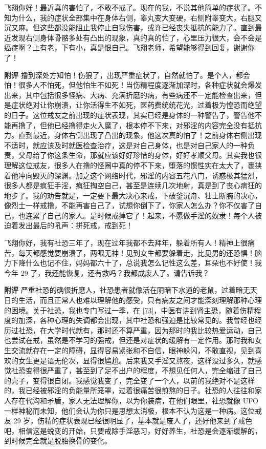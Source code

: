 \begin{case}
    飞翔你好！最近真的害怕了，不敢不戒了。现在的我，不说其他简单的症状了。不知为什么，我的症状全部集中在身体右侧，睾丸变大变硬，右侧附睾变大，右腿又沉又麻。但这些都没能阻止我停止自我伤害，或许已经丧失抵抗的能力了。直到最近发现右侧身体骨骼多处有凸出的现象，真的真的怕了，心里压力很大，会不会是癌症啊？上有老，下有小，真是恨自己。飞翔老师，希望能够得到回复，谢谢你了！

    \textbf{附评} 撸到深处方知怕！伤狠了，出现严重症状了，自然就怕了。是个人，都会怕！很多人不怕死，但他怕生不如死！当伤精程度逐渐加深时，各种症状就会爆发出来，其中包括很多怪病、大病、充满折磨的病，有些病还不一定能检查出来，但是症状绝对让你崩溃，让你活得生不如死，医药费统统花光，过着极为惶恐而绝望的日子。这位戒友之前出现的症状表现，其实已经是身体的一种警告了，警告他不能再撸了，但他已经撸得走火入魔了，根本停不下来，对邪淫的内容完全没有抵抗力。直到最近，身体右侧出现了凸出的现象，他这次真的怕了！之前身体右侧出现不适时，就应该及时就医检查治疗，这是对自己身体，也是对自己家人的一种负责，父母给了你这条生命，那就应该好好珍惜的身体，好好孝顺父母。其实我也很理解这位戒友，很多人在撸的怪圈中真的停不下来，堕落的惯性实在太大了，裹挟着他冲向毁灭的深渊。加之这个网络时代，邪淫的内容五花八门，诱惑极其猛烈，很多人都是疯狂手淫，疯狂掏空自己，甚至是连续几次地射，真是到了丧心病狂的地步了。我的劝告就是，一定要下最大决心来戒，下破釜沉舟、壮士断腕的决心，像烈士一样戒撸，不能再害自己了，试想你倒下了，你家人怎么办？你不仅害了自己，也连累了自己的家人。是时候戒掉它了！起来，不愿做手淫的奴隶！每个人被迫着发出最后的吼声：拼死戒，戒到死！
\end{case}

\begin{case}
    飞翔你好，我有社恐三年了，现在过年我都不去拜年，躲着所有人！精神上很痛苦，每天都感觉要崩溃了，两眼无神！见到女生都要躲着走，比见男的还恐惧！脑力下降什么也记不住，妈妈都六十了，总说我怎么记性这么差，耳朵也不好使！我今年 29 了，我还能恢复，还有救吗？我都成废人了。请告诉我？

    \textbf{附评} 严重社恐的确很折磨人，社恐患者就像活在阴暗下水道的老鼠，过着暗无天日的生活，而且正常人也难以理解他的感受，只有病友之间才能深刻理解那种心理的困境。关于社恐，我也专门写过一季，在 \ref{73}，中医有讲到肾主恐，随着伤精程度的加深，各种心理的失调都会出现，其中社恐和强迫是比较常见的。我曾经也经历过社恐，在大学时代就有，那时还不算严重，因为那时的我比较热爱运动，自己也尝试在戒，虽然是不学习的强戒，但还是对症状的缓解有一定作用。那时我和女生交流就存在一定的障碍，显得容易紧张和不自信，眼神躲闪，不敢直视，见到喜欢的女生更是语无伦次，显得很尴尬。后来我又手淫又熬夜，这样没过多久，就感觉社恐变得很严重了，甚至到了足不出户的程度，不想见任何人，完全缩进了自己的壳子，变得很自闭。我感觉我变了，完全变了一个人，以前的我绝对不是这样的，我已经被邪淫的负能量所笼罩，过着很痛苦很煎熬的日子。社恐的人往往和家人存在代沟和矛盾，家人无法理解你，以为你装病，在他们眼里，社恐就像 UFO 一样神秘而未知，他们会认为你只是思想太消极，根本不认为这是一种病。这位戒友 29 岁，伤精的症状表现已经很明显了，基本就是废人了，还好他来到了戒色吧，相信这是蜕变的开始，只要戒除手淫恶习，好好养生，社恐是会逐渐缓解的，到时候完全就是脱胎换骨的变化。
\end{case}

